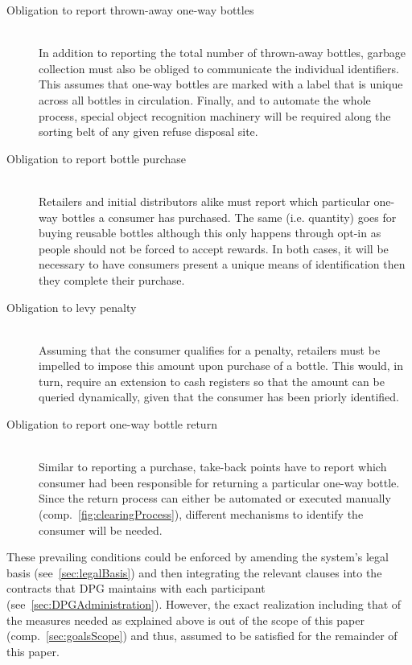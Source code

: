 \begin{description}
	\item[Obligation to report thrown-away one-way bottles]
	\hfill \\
	In addition to reporting the total number of thrown-away bottles\hide{(\ref{itm:reportNumber})}, garbage collection must also be obliged to communicate the individual identifiers\hide{(\ref{itm:reportIdentifier})}. This assumes that one-way bottles are marked with a label that is unique across all bottles in circulation. Finally, and to automate the whole process, special object recognition machinery will be required along the sorting belt of any given refuse disposal site.
	\item[Obligation to report bottle purchase]
	\hfill \\
	Retailers and initial distributors alike must report which particular one-way bottles a consumer has purchased\hide{(\ref{itm:reportOneWays})}. The same (i.e. quantity) goes for buying reusable bottles \hide{(\ref{itm:reportReusableNumber})} although this only happens through opt-in as people should not be forced to accept rewards. In both cases, it will be necessary to have consumers present a unique means of identification then they complete their purchase.
	\item[Obligation to levy penalty]
	\hfill \\
	Assuming that the consumer qualifies for a penalty, retailers must be impelled to impose this amount upon purchase of a bottle. This would, in turn, require an extension to cash registers so that the amount can be queried dynamically\hide{(\ref{itm:lookUpPenalty})}, given that the consumer has been priorly identified.
	\item[Obligation to report one-way bottle return]
	\hfill \\
	Similar to reporting a purchase, take-back points have to report which consumer had been responsible for returning a particular one-way bottle\hide{(\ref{itm:reportOneWayReturn})}. Since the return process can either be automated or executed manually (comp.~\autoref{fig:clearingProcess}), different mechanisms to identify the consumer will be needed.  
\end{description}

These prevailing conditions could be enforced by amending the system's legal basis (see~\ref{sec:legalBasis}) and then integrating the relevant clauses into the contracts that \ac{DPG} maintains with each participant (see~\ref{sec:DPGAdministration}). However, the exact realization including that of the measures needed as explained above is out of the scope of this paper (comp.~\ref{sec:goalsScope}) and thus, assumed to be satisfied for the remainder of this paper. 

